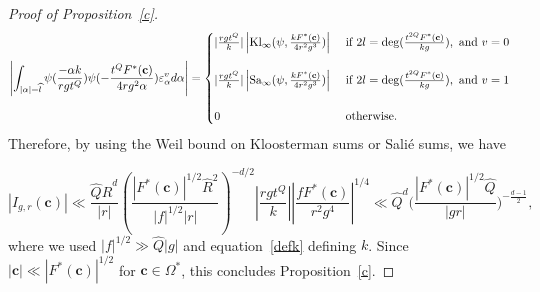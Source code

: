 \documentclass[10pt]{amsart}
\theoremstyle{plain}
\theoremstyle{plain}
\renewcommand{\vec}[1]{\mathbf{#1}}
\theoremstyle{remark}
\theoremstyle{definition}
\renewcommand{\hat}{\widehat}
\newcommand{\hQ}{\widehat{Q}}
\newcommand{\hR}{\widehat{R}}
\newcommand{\Kl}{\textup{Kl}}
\newcommand{\Sa}{\textup{Sa}}
\begin{document}
\begin{proof}[Proof of Proposition~\ref{c}]
\begin{equation*}
\begin{split}
\left| \int _{ |\alpha| =\hat{l}  }  \psi(\frac{-\alpha k}{rgt^Q})   \psi (-\frac{t^QF^*(\vec{c})}{4rg^2 \alpha}) \varepsilon_{\alpha}^v  d\alpha \right|=\begin{cases} 
 |\frac{rgt^Q}{ k}|\left| \Kl_{\infty}(\psi, \frac{kF^*(\vec{c})}{4r^2g^3})\right| &\text{  if } 2l=\deg(\frac{t^{2Q}F^*(\vec{c})}{kg}), \text{ and } v=0
 \\
 \\
 |\frac{rgt^Q}{ k}| \left|\Sa_{\infty}(\psi, \frac{kF^*(\vec{c})}{4r^2g^3})\right| &\text{  if } 2l=\deg(\frac{t^{2Q}F^*(\vec{c})}{kg}), \text{ and } v=1
 \\
 \\
 0 &\text{ otherwise.}
 \end{cases} 
\end{split}
\end{equation*}
Therefore, by using the Weil bound on Kloosterman sums or Sali\'e sums,  we have

\[
|I_{g,r}(\vec{c})| \ll \frac{\hQ\hR^{d}}{|r|}\left(\frac{ |F^*(\vec{c})|^{1/2} \hR^2}{|f|^{1/2}|r|}\right)^{-d/2} \left|\frac{rgt^Q}{ k}\right|   \left|\frac{fF^*(\vec{c})}{r^2g^4}\right|^{1/4}\ll  \hQ^d\Big(\frac{|F^*(\vec{c})|^{1/2}\hQ}{|gr|}   \Big)^{-\frac{d-1}{2}},
\]
where we used $|f|^{1/2}\gg \hQ|g|$ and equation~\eqref{defk} defining $k$. Since $|\vec{c}|\ll |F^*(\vec{c})|^{1/2} $ for $\vec{c}\in \Omega^*$, this concludes Proposition~\ref{c}.

\end{proof}
\end{document}
